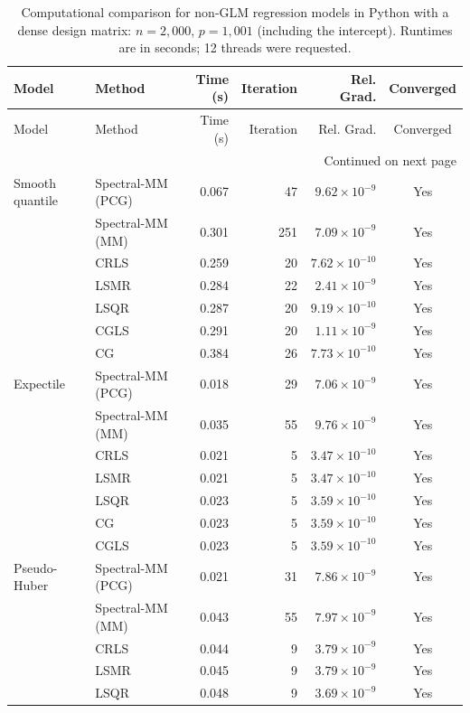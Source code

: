 \begingroup
\small
\setlength{\tabcolsep}{5pt}
\begin{longtable}{llrrrc}
\caption{Computational comparison for non-GLM regression models in Python with a dense design matrix: $n=2{,}000$, $p=1{,}001$ (including the intercept). Runtimes are in seconds; 12 threads were requested.}
\label{tab:python-dense-nonglm-strict}\\
\toprule
Model & Method & Time (s) & Iteration & Rel. Grad. & Converged \\
\midrule
\endfirsthead
\toprule
Model & Method & Time (s) & Iteration & Rel. Grad. & Converged \\
\midrule
\endhead
\midrule
\multicolumn{6}{r}{Continued on next page}\\
\endfoot
\bottomrule
\endlastfoot
Smooth quantile & Spectral-MM (PCG) & 0.067 & 47 & $9.62\times10^{-9}$ & Yes \\
 & Spectral-MM (MM) & 0.301 & 251 & $7.09\times10^{-9}$ & Yes \\
 & CRLS & 0.259 & 20 & $7.62\times10^{-10}$ & Yes \\
 & LSMR & 0.284 & 22 & $2.41\times10^{-9}$ & Yes \\
 & LSQR & 0.287 & 20 & $9.19\times10^{-10}$ & Yes \\
 & CGLS & 0.291 & 20 & $1.11\times10^{-9}$ & Yes \\
 & CG & 0.384 & 26 & $7.73\times10^{-10}$ & Yes \\
\midrule
Expectile & Spectral-MM (PCG) & 0.018 & 29 & $7.06\times10^{-9}$ & Yes \\
 & Spectral-MM (MM) & 0.035 & 55 & $9.76\times10^{-9}$ & Yes \\
 & CRLS & 0.021 & 5 & $3.47\times10^{-10}$ & Yes \\
 & LSMR & 0.021 & 5 & $3.47\times10^{-10}$ & Yes \\
 & LSQR & 0.023 & 5 & $3.59\times10^{-10}$ & Yes \\
 & CG & 0.023 & 5 & $3.59\times10^{-10}$ & Yes \\
 & CGLS & 0.023 & 5 & $3.59\times10^{-10}$ & Yes \\
\midrule
Pseudo-Huber & Spectral-MM (PCG) & 0.021 & 31 & $7.86\times10^{-9}$ & Yes \\
 & Spectral-MM (MM) & 0.043 & 55 & $7.97\times10^{-9}$ & Yes \\
 & CRLS & 0.044 & 9 & $3.79\times10^{-9}$ & Yes \\
 & LSMR & 0.045 & 9 & $3.79\times10^{-9}$ & Yes \\
 & LSQR & 0.048 & 9 & $3.69\times10^{-9}$ & Yes \\

\end{longtable}
